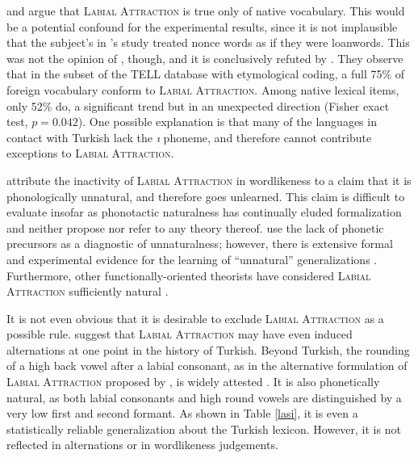 \citet{NiChiosain1993} and \citet{Ito1995b} argue that \textsc{Labial Attraction} is true only of native vocabulary. This would be a potential confound for the experimental results, since it is not implausible that the subject's in \citeauthor{Zimmer1969}'s study treated nonce words as if they were loanwords. 
This was not the opinion of \citet[266]{Lees1966a}, though, and it is conclusively refuted by  \citet{Inkelas2001}. They observe that in the subset of the TELL database with etymological coding, a full 75\% of foreign vocabulary conform to \textsc{Labial Attraction}. Among native lexical items, only 52\% do, a significant trend but in an unexpected direction (Fisher exact test, $p = 0.042$). One possible explanation is that many of the languages in contact with Turkish lack the \emph{ı} phoneme, and therefore cannot contribute exceptions to \textsc{Labial Attraction}.

\citet{Becker2011} attribute the inactivity of \textsc{Labial Attraction} in wordlikeness to a claim that it is phonologically unnatural, and therefore goes unlearned. This claim is difficult to evaluate insofar as phonotactic naturalness has continually eluded formalization and \citeauthor{Becker2011} neither propose nor refer to any theory thereof. \citeauthor{Becker2011} use the lack of phonetic precursors as a diagnostic of unnaturalness; however, there is extensive formal and experimental evidence for the learning of ``unnatural'' generalizations \citep[e.g.,][]{Anderson1981,Bach1972,Blevins2003,Buckley2000a,Hayes2009,Pierrehumbert2006c,Seidl2005}. Furthermore, other functionally-oriented theorists have considered \textsc{Labial Attraction} sufficiently natural \citep[e.g.,][]{NiChiosain1993,Ito1993,Ito1995b}. 

It is not even obvious that it is desirable to exclude \textsc{Labial Attraction} as a possible rule. \citet[394, fn. 2]{Inkelas1997} suggest that \textsc{Labial Attraction} may have even induced alternations at one point in the history of Turkish. Beyond Turkish, the rounding of a high back vowel after a labial consonant, as in the alternative formulation of \textsc{Labial Attraction} proposed by \citet{Inkelas2001}, is widely attested \citep[e.g.,][]{Vaux1993}. It is also phonetically natural, as both labial consonants and high round vowels are distinguished by a very low first and second formant. As shown in Table \ref{lasi}, it is even a statistically reliable generalization about the Turkish lexicon. However, it is not reflected in alternations or in wordlikeness judgements.

